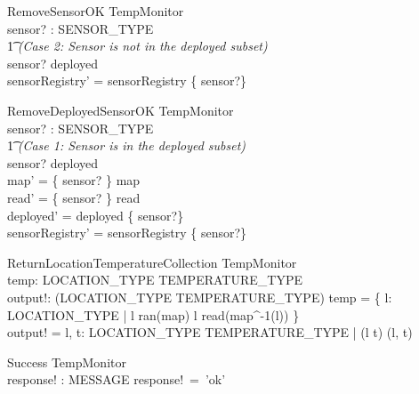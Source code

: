\documentclass[12pt]{article}
\begin{document}
        \begin{schema}{RemoveSensorOK}
            \Delta TempMonitor\\
            sensor? : SENSOR\_TYPE\\
            \where
            \t1 \textit{(\small Case 2: Sensor is not in the deployed subset)} \\
            sensor? \notin deployed \\
            sensorRegistry' = sensorRegistry \setminus \{ sensor?\}\\
        \end{schema}
        \begin{schema}{RemoveDeployedSensorOK}
            \Delta TempMonitor\\
            sensor? : SENSOR\_TYPE\\
            \where
            \t1 \textit{(\small Case 1: Sensor is in the deployed subset)} \\
            sensor? \in deployed \\
            map' = \{ sensor? \} \dsub map \\
            read' = \{ sensor? \} \dsub read \\
            deployed' = deployed \setminus \{ sensor?\}\\
            sensorRegistry' = sensorRegistry \setminus \{ sensor?\}
        \end{schema}



        \begin{schema}{ReturnLocationTemperatureCollection}
         \Xi TempMonitor \\
         temp: LOCATION\_TYPE \pfun TEMPERATURE\_TYPE \\
         output!: \seq (LOCATION\_TYPE \cross TEMPERATURE\_TYPE)
        \where
         temp = \{ l: LOCATION\_TYPE | l \in ran(map) \implies l \mapsto read(map^{-1}(l)) \} \\
         output! = \langle l, t: LOCATION\_TYPE \cross TEMPERATURE\_TYPE | (l \mapsto t) \in \temp \implies (l, t) \rangle \\
        \end{schema}

        
	
		\begin{schema}{Success}
			\Xi TempMonitor\\
			response! : MESSAGE
			\where
			response!~=~'ok'\\
		\end{schema}
		
\end{document}
